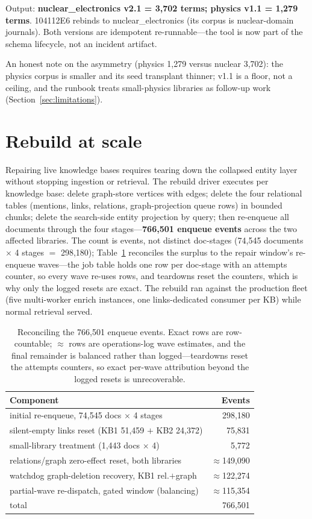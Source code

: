 \documentclass[preprint,12pt]{elsarticle}
\begin{document}
Output: \textbf{nuclear\_electronics v2.1 = 3{,}702 terms; physics v1.1 =
1{,}279 terms}. 104112E6 rebinds to nuclear\_electronics (its corpus is
nuclear-domain journals). Both versions are idempotent re-runnable---the
tool is now part of the schema lifecycle, not an incident artifact.

An honest note on the asymmetry (physics 1{,}279 versus nuclear 3{,}702):
the physics corpus is smaller and its seed transplant thinner; v1.1 is a
floor, not a ceiling, and the runbook treats small-physics libraries as
follow-up work (Section~\ref{sec:limitations}).

\section{Rebuild at scale}
\label{sec:rebuild}

Repairing live knowledge bases requires tearing down the collapsed entity
layer without stopping ingestion or retrieval. The rebuild driver executes
per knowledge base: delete graph-store vertices with edges; delete the four
relational tables (mentions, links, relations, graph-projection queue rows)
in bounded chunks; delete the search-side entity projection by query; then
re-enqueue all documents through the four stages---\textbf{766{,}501 enqueue events}
across the two affected libraries. The count is events, not distinct
doc-stages (74{,}545 documents $\times$ 4 stages $=$ 298{,}180);
Table~\ref{tab:reconcile} reconciles the surplus to the repair
window's re-enqueue waves---the job table holds one row per doc-stage
with an attempts counter, so every wave re-uses rows, and teardowns
reset the counters, which is why only the logged resets are exact.
The rebuild ran against the production
fleet (five multi-worker enrich instances, one links-dedicated consumer per
KB) while normal retrieval served.

\begin{table}[t]
\centering
\caption{Reconciling the 766{,}501 enqueue events. Exact rows are
row-countable; ${\approx}$ rows are operations-log wave estimates,
and the final remainder is balanced rather than logged---teardowns
reset the attempts counters, so exact per-wave attribution beyond
the logged resets is unrecoverable.}
\label{tab:reconcile}
\small
\begin{tabular}{@{}lr@{}}
\toprule
Component & Events \\
\midrule
initial re-enqueue, 74{,}545 docs $\times$ 4 stages & 298{,}180 \\
silent-empty links reset (KB1 51{,}459 $+$ KB2 24{,}372) & 75{,}831 \\
small-library treatment (1{,}443 docs $\times$ 4) & 5{,}772 \\
relations/graph zero-effect reset, both libraries & ${\approx}$149{,}090 \\
watchdog graph-deletion recovery, KB1 rel.$+$graph & ${\approx}$122{,}274 \\
partial-wave re-dispatch, gated window (balancing) & ${\approx}$115{,}354 \\
\midrule
total & 766{,}501 \\
\bottomrule
\end{tabular}
\end{table}
\end{document}
